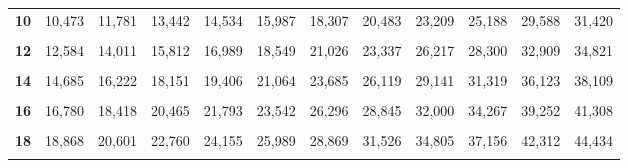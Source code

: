 \documentclass[
  11pt,
  ngerman,
  a4paper,
]{report}
\begin{document}
\begin{table}[H]
{\begin{tabular}{>{}r|rrrrrrrrrrr}
\textbf{10} & 10,473 & 11,781 & 13,442 & 14,534 & 15,987 & 18,307 & 20,483 & 23,209 & 25,188 & 29,588 & 31,420\\
\addlinespace
\textbf{\cellcolor{gray!6}{11}} & \cellcolor{gray!6}{11,530} & \cellcolor{gray!6}{12,899} & \cellcolor{gray!6}{14,631} & \cellcolor{gray!6}{15,767} & \cellcolor{gray!6}{17,275} & \cellcolor{gray!6}{19,675} & \cellcolor{gray!6}{21,920} & \cellcolor{gray!6}{24,725} & \cellcolor{gray!6}{26,757} & \cellcolor{gray!6}{31,264} & \cellcolor{gray!6}{33,137}\\
\textbf{12} & 12,584 & 14,011 & 15,812 & 16,989 & 18,549 & 21,026 & 23,337 & 26,217 & 28,300 & 32,909 & 34,821\\
\textbf{\cellcolor{gray!6}{13}} & \cellcolor{gray!6}{13,636} & \cellcolor{gray!6}{15,119} & \cellcolor{gray!6}{16,985} & \cellcolor{gray!6}{18,202} & \cellcolor{gray!6}{19,812} & \cellcolor{gray!6}{22,362} & \cellcolor{gray!6}{24,736} & \cellcolor{gray!6}{27,688} & \cellcolor{gray!6}{29,819} & \cellcolor{gray!6}{34,528} & \cellcolor{gray!6}{36,478}\\
\textbf{14} & 14,685 & 16,222 & 18,151 & 19,406 & 21,064 & 23,685 & 26,119 & 29,141 & 31,319 & 36,123 & 38,109\\
\textbf{\cellcolor{gray!6}{15}} & \cellcolor{gray!6}{15,733} & \cellcolor{gray!6}{17,322} & \cellcolor{gray!6}{19,311} & \cellcolor{gray!6}{20,603} & \cellcolor{gray!6}{22,307} & \cellcolor{gray!6}{24,996} & \cellcolor{gray!6}{27,488} & \cellcolor{gray!6}{30,578} & \cellcolor{gray!6}{32,801} & \cellcolor{gray!6}{37,697} & \cellcolor{gray!6}{39,719}\\
\addlinespace
\textbf{16} & 16,780 & 18,418 & 20,465 & 21,793 & 23,542 & 26,296 & 28,845 & 32,000 & 34,267 & 39,252 & 41,308\\
\textbf{\cellcolor{gray!6}{17}} & \cellcolor{gray!6}{17,824} & \cellcolor{gray!6}{19,511} & \cellcolor{gray!6}{21,615} & \cellcolor{gray!6}{22,977} & \cellcolor{gray!6}{24,769} & \cellcolor{gray!6}{27,587} & \cellcolor{gray!6}{30,191} & \cellcolor{gray!6}{33,409} & \cellcolor{gray!6}{35,718} & \cellcolor{gray!6}{40,790} & \cellcolor{gray!6}{42,879}\\
\textbf{18} & 18,868 & 20,601 & 22,760 & 24,155 & 25,989 & 28,869 & 31,526 & 34,805 & 37,156 & 42,312 & 44,434\\
\textbf{\cellcolor{gray!6}{19}} & \cellcolor{gray!6}{19,910} & \cellcolor{gray!6}{21,689} & \cellcolor{gray!6}{23,900} & \cellcolor{gray!6}{25,329} & \cellcolor{gray!6}{27,204} & \cellcolor{gray!6}{30,144} & \cellcolor{gray!6}{32,852} & \cellcolor{gray!6}{36,191} & \cellcolor{gray!6}{38,582} & \cellcolor{gray!6}{43,820} & \cellcolor{gray!6}{45,973}\\

\end{tabular}}
\end{table}
\end{document}
